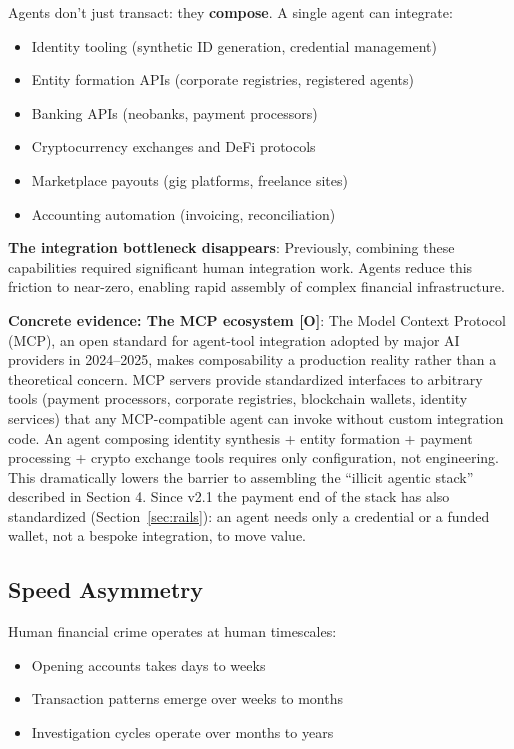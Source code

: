 \documentclass[11pt,letterpaper]{article}
\begin{document}
\begin{warnbox}
Agents don't just transact: they \textbf{compose}. A single agent can integrate:
\begin{itemize}
  \item Identity tooling (synthetic ID generation, credential management)
  \item Entity formation APIs (corporate registries, registered agents)
  \item Banking APIs (neobanks, payment processors)
  \item Cryptocurrency exchanges and DeFi protocols
  \item Marketplace payouts (gig platforms, freelance sites)
  \item Accounting automation (invoicing, reconciliation)
\end{itemize}

\textbf{The integration bottleneck disappears}: Previously, combining these capabilities required significant human integration work. Agents reduce this friction to near-zero, enabling rapid assembly of complex financial infrastructure.

\textbf{Concrete evidence: The MCP ecosystem [O]}: The Model Context Protocol (MCP), an open standard for agent-tool integration adopted by major AI providers in 2024--2025, makes composability a production reality rather than a theoretical concern. MCP servers provide standardized interfaces to arbitrary tools (payment processors, corporate registries, blockchain wallets, identity services) that any MCP-compatible agent can invoke without custom integration code. An agent composing identity synthesis + entity formation + payment processing + crypto exchange tools requires only configuration, not engineering. This dramatically lowers the barrier to assembling the ``illicit agentic stack'' described in Section 4. Since v2.1 the payment end of the stack has also standardized (Section~\ref{sec:rails}): an agent needs only a credential or a funded wallet, not a bespoke integration, to move value.
\end{warnbox}

\subsection{Speed Asymmetry}

Human financial crime operates at human timescales:
\begin{itemize}
  \item Opening accounts takes days to weeks
  \item Transaction patterns emerge over weeks to months
  \item Investigation cycles operate over months to years
\end{itemize}
\end{document}
